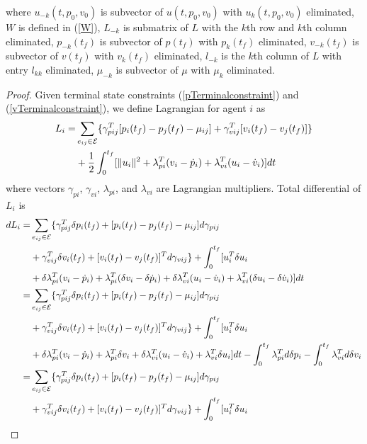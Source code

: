 \documentclass[12pt,draftcls,onecolumn]{IEEEtran}  %
\begin{document}
{\begin{thm}
where $u_{-k}(t,p_0,v_0)$ is subvector of $u(t,p_0,v_0)$ with $u_k(t,p_0,v_0)$ eliminated, $W$ is defined in (\ref{W}), $L_{-k}$ is submatrix of $L$ with the $k$th row and $k$th column eliminated, $p_{-k}(t_f)$ is subvector of $p(t_f)$ with $p_k(t_f)$ eliminated, $v_{-k}(t_f)$ is subvector of $v(t_f)$ with $v_k(t_f)$ eliminated, $l_{-k}$ is the $k$th column of $L$ with entry $l_{kk}$ eliminated, $\mu_{-k}$ is subvector of $\mu$ with $\mu_k$ eliminated.
\end{thm}
\begin{proof}
Given terminal state constraints (\ref{pTerminalconstraint}) and (\ref{vTerminalconstraint}), we define Lagrangian for agent $i$ as
\begin{align}
L_i=&\sum_{e_{ij}\in\mathcal{E}}\{\gamma^T_{pij}
[p_i(t_f)-p_j(t_f)-\mu_{ij}]+\gamma^T_{vij}
[v_i(t_f)-v_j(t_f)]\}\notag\\
&+\frac{1}{2}\int_0^{t_f} [\|u_i\|^2+ \lambda_{pi}^T(v_i-\dot{p}_i)+
\lambda_{vi}^T(u_i-\dot{v}_i)]\mbox{d}t
\end{align}
where vectors $\gamma_{pi}$, $\gamma_{vi}$, $\lambda_{pi}$, and $\lambda_{vi}$ are Lagrangian multipliers. Total differential of $L_i$ is
\begin{align}
d L_i=&\sum_{e_{ij}\in\mathcal{E}}\{\gamma^T_{pij}
\delta p_i(t_f)+[ p_i(t_f)-p_j(t_f)-\mu_{ij}]d\gamma_{pij}\notag\\
&+\gamma^T_{vij}\delta v_i(t_f)+[ v_i(t_f)-v_j(t_f)]^Td\gamma_{vij}\}+\int_0^{t_f} [u_i^T\delta u_i \notag\\
&+ \delta \lambda_{pi}^T(v_i-\dot{p}_i)+ \lambda_{pi}^T(\delta v_i-\delta \dot{p}_i)
+\delta \lambda_{vi}^T(u_i-\dot{v}_i) + \lambda_{vi}^T(\delta u_i-\delta \dot{v}_i)]\mbox{d}t\notag\\
=&\sum_{e_{ij}\in\mathcal{E}}\{\gamma^T_{pij}
\delta p_i(t_f)+[ p_i(t_f)-p_j(t_f)-\mu_{ij}]d\gamma_{pij}\notag\\
&+\gamma^T_{vij}\delta v_i(t_f)+[ v_i(t_f)-v_j(t_f)]^Td\gamma_{vij}\}+\int_0^{t_f} [u_i^T\delta u_i \notag\\
&+ \delta \lambda_{pi}^T(v_i-\dot{p}_i)+ \lambda_{pi}^T\delta v_i
+\delta \lambda_{vi}^T(u_i-\dot{v}_i) + \lambda_{vi}^T\delta u_i]\mbox{d}t-\int_{0}^{t_f} \lambda_{pi}^T\mbox{d}\delta p_i -\int_{0}^{t_f} \lambda_{vi}^T\mbox{d}\delta v_i\notag\\
=&\sum_{e_{ij}\in\mathcal{E}}\{\gamma^T_{pij}
\delta p_i(t_f)+[ p_i(t_f)-p_j(t_f)-\mu_{ij}]d\gamma_{pij}\notag\\
&+\gamma^T_{vij}\delta v_i(t_f)+[ v_i(t_f)-v_j(t_f)]^Td\gamma_{vij}\}+\int_0^{t_f} [u_i^T\delta u_i \notag\\

\end{align}
\end{proof}}
\end{document}
